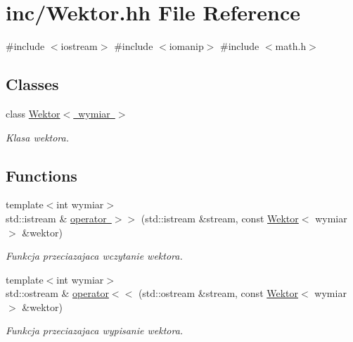 \hypertarget{_wektor_8hh}{}\section{inc/\+Wektor.hh File Reference}
\label{_wektor_8hh}
{\ttfamily \#include $<$iostream$>$}\newline
{\ttfamily \#include $<$iomanip$>$}\newline
{\ttfamily \#include $<$math.\+h$>$}\newline
\subsection*{Classes}
\begin{DoxyCompactItemize}
\item 
class \mbox{\hyperlink{class_wektor}{Wektor$<$ wymiar $>$}}
\begin{DoxyCompactList}\small\item\em Klasa wektora. \end{DoxyCompactList}\end{DoxyCompactItemize}
\subsection*{Functions}
\begin{DoxyCompactItemize}
\item 
{\footnotesize template$<$int wymiar$>$ }\\std\+::istream \& \mbox{\hyperlink{_wektor_8hh_abf2432e4e296349d9fc00d99d2d5afd4}{operator $>$$>$}} (std\+::istream \&stream, const \mbox{\hyperlink{class_wektor}{Wektor}}$<$ wymiar $>$ \&wektor)
\begin{DoxyCompactList}\small\item\em Funkcja przeciazajaca wczytanie wektora. \end{DoxyCompactList}\item 
{\footnotesize template$<$int wymiar$>$ }\\std\+::ostream \& \mbox{\hyperlink{_wektor_8hh_a5e31ef6f7e06a11a2747548f8bd2b80e}{operator$<$$<$}} (std\+::ostream \&stream, const \mbox{\hyperlink{class_wektor}{Wektor}}$<$ wymiar $>$ \&wektor)
\begin{DoxyCompactList}\small\item\em Funkcja przeciazajaca wypisanie wektora. \end{DoxyCompactList}\end{DoxyCompactItemize}


